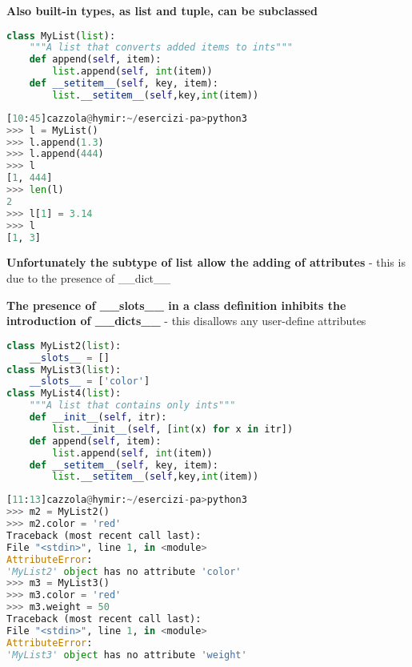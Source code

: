 \textbf{Also built-in types, as list and tuple, can be subclassed}

\begin{lstlisting}[language=Python]
class MyList(list):
	"""A list that converts added items to ints"""
	def append(self, item):
		list.append(self, int(item))
	def __setitem__(self, key, item):
		list.__setitem__(self,key,int(item))
\end{lstlisting}

\begin{lstlisting}[language=Python]
[10:45]cazzola@hymir:~/esercizi-pa>python3
>>> l = MyList()
>>> l.append(1.3)
>>> l.append(444)
>>> l
[1, 444]
>>> len(l)
2
>>> l[1] = 3.14
>>> l
[1, 3]
\end{lstlisting}

\textbf{Unfortunately the subtype of list allow the adding of attributes}
- this is due to the presence of \_\_dict\_\_

\textbf{The presence of \_\_slots\_\_ in a class definition inhibits the introduction of \_\_dicts\_\_}
- this disallows any user-define attributes

\begin{lstlisting}[language=Python]
class MyList2(list):
	__slots__ = []
class MyList3(list):
	__slots__ = ['color']
class MyList4(list):
	"""A list that contains only ints"""
	def __init__(self, itr):
		list.__init__(self, [int(x) for x in itr])
	def append(self, item):
		list.append(self, int(item))
	def __setitem__(self, key, item):
		list.__setitem__(self,key,int(item))
\end{lstlisting}


\begin{lstlisting}[language=Python]
[11:13]cazzola@hymir:~/esercizi-pa>python3
>>> m2 = MyList2()
>>> m2.color = 'red'
Traceback (most recent call last):
File "<stdin>", line 1, in <module>
AttributeError:
'MyList2' object has no attribute 'color'
>>> m3 = MyList3()
>>> m3.color = 'red'
>>> m3.weight = 50
Traceback (most recent call last):
File "<stdin>", line 1, in <module>
AttributeError:
'MyList3' object has no attribute 'weight'
\end{lstlisting}